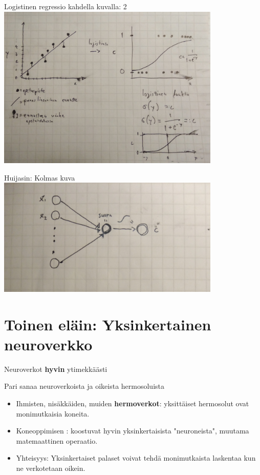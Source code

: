 \documentclass[presentation]{beamer}
\begin{document}
\begin{frame}{Logistinen regressio kahdella kuvalla: 2}
    \includegraphics[width=0.8\textwidth]{logistinen2.jpg}
\end{frame}

\begin{frame}{Huijasin: Kolmas kuva}
    \includegraphics[width=0.8\textwidth]{logistinen_perceptron.jpg}
\end{frame}

\section{Toinen eläin: Yksinkertainen neuroverkko}

\begin{frame}{}
  \tableofcontents[currentsection]
\end{frame}

\begin{frame}{Neuroverkot \textbf{hyvin} ytimekkäästi}
    
\end{frame}

\begin{frame}{Pari sanaa neuroverkoista ja oikeista hermosoluista}
    \begin{itemize}
        \item<1-> Ihmisten, nisäkkäiden, muiden \textbf{hermoverkot}: yksittäiset hermosolut ovat monimutkaisia koneita.
        \item<2-> Koneoppimisen : koostuvat hyvin yksinkertaisista "neuroneista", muutama matemaattinen operaatio.
        \item<3-> Yhteisyys: Yksinkertaiset palaset voivat tehdä monimutkaista laskentaa kun ne verkotetaan oikein. 
    \end{itemize}
\end{frame}
\end{document}
